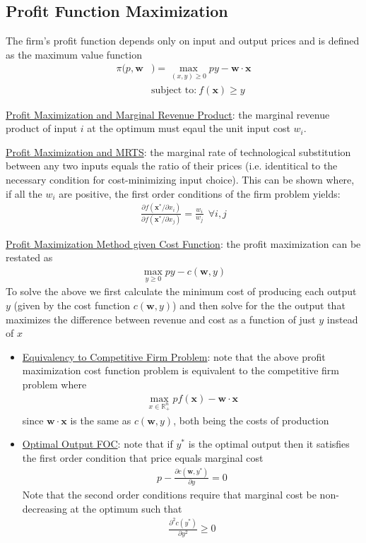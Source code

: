 \documentclass{article}
\begin{document}
\subsection{Profit Function Maximization}
The firm's profit function depends only on input and output prices and is defined as the maximum value function
\begin{align*}
  \pi (p,\mathbf{w}&) = \max_{(x,y) \geq 0} py - \mathbf{w} \cdot \mathbf{x} \\
  &\text{subject to:} \ f(\mathbf{x}) \geq y
\end{align*}
\par \vspace{0.3em}
  \underline{Profit Maximization and Marginal Revenue Product}: the marginal revenue product of input $i$ at the optimum must eqaul the unit input cost $w_{i}$.
  \par
  \underline{Profit Maximization and MRTS}: the marginal rate of technological substitution between any two inputs equals the ratio of their prices (i.e. identitical to the necessary condition for cost-minimizing input choice). This can be shown where, if all the $w_{i}$ are positive, the first order conditions of the firm problem yields:
  \begin{gather*}
    \frac{\partial f(\mathbf{x}^{*} / \partial x_{i})}{\partial f (\mathbf{x}^{*} / \partial x_{j})} = \frac{w_{i}}{w_{j}} \ \ \forall i, j
  \end{gather*}
  \par
  \underline{Profit Maximization Method given Cost Function}: the profit maximization can be restated as
  \begin{gather*}
    \max_{y \geq 0} py - c(\mathbf{w}, y)
  \end{gather*}
  To solve the above we first calculate the minimum cost of producing each output $y$ (given by the cost function $c(\mathbf{w}, y)$) and then solve for the the output that maximizes the difference between revenue and cost as a function of just $y$ instead of $x$
  \begin{itemize}
    \item  \underline{Equivalency to Competitive Firm Problem}: note that the above profit maximization cost function problem is equivalent to the competitive firm problem where
    \begin{gather*}
      \max_{x \in \mathbb{R}_{+}^{n}} pf(\mathbf{x}) - \mathbf{w} \cdot \mathbf{x}
    \end{gather*}
    since $\mathbf{w} \cdot \mathbf{x}$ is the same as $c(\mathbf{w}, y)$, both being the costs of production
    \item  \underline{Optimal Output FOC}: note that if $y^{*}$ is the optimal output then it satisfies the first order condition that price equals marginal cost
    \begin{gather*}
      p - \frac{\partial c(\mathbf{w}, y^{*})}{\partial y} = 0
    \end{gather*}
    Note that the second order conditions require that marginal cost be non-decreasing at the optimum such that
    \begin{gather*}
      \frac{\partial^{2} c(y^{*})}{\partial y^{2}} \geq 0
    \end{gather*}
  \end{itemize}
\end{document}
